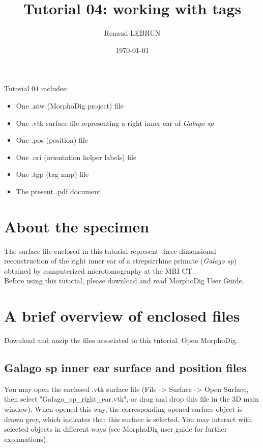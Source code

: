 \documentclass[12pt, a4paper]{book}
\title{Tutorial 04: working with tags}
\author{Renaud LEBRUN}
\affil{Institut des Sciences de l'Evolution, Université de Montpellier, France}
\date{\today}
\begin{document}
\dominitoc	

\maketitle

\faketableofcontents



\minitoc 
Tutorial 04 includes:
\begin{itemize}
\item One .ntw (MorphoDig project) file
\item One .vtk surface file representing a right inner ear of \textit{Galago sp}
\item One .pos (position) file 
\item One .ori (orientation helper labels) file 
\item One .tgp (tag map) file
\item The present .pdf document
\end{itemize}





\section{About the specimen}

The surface file enclosed in this tutorial represent three-dimensional reconstruction of the right inner ear of a strepsirrhine primate (\textit{Galago sp}) obtained by computerized microtomography at the MRI \si{\micro} CT.\\
Before using this tutorial, please download and read MorphoDig User Guide.


\section{A brief overview of enclosed files}
		Download and unzip the files associated to this tutorial. Open MorphoDig.
\subsection{Galago sp inner ear surface and position files}
	You may open the enclosed .vtk surface file (File -> Surface -> Open Surface, then select "Galago\_sp\_right\_ear.vtk", or drag and drop this file in the 3D main window). When opened
this way, the corresponding opened surface object is drawn grey, which indicates that this surface
is selected. You may interact with selected objects in different ways (see MorphoDig user guide for
further explanations).\\
\end{document}
